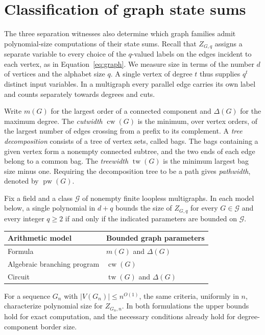\section{Classification of graph state sums}\label{sec:graph-classification}

The three separation witnesses also determine which graph families
admit polynomial-size computations of their state sums. Recall that
\(Z_{G,q}\) assigns a separate variable to every choice of the
\(q\)-valued labels on the
edges incident to each vertex, as in Equation~\eqref{eq:graph}.
We measure size in terms of the number \(d\) of vertices and the
alphabet size \(q\). A single vertex of degree \(t\) thus supplies
\(q^t\) distinct input variables. In a multigraph every parallel edge
carries its own label and counts separately towards degrees and cuts.

Write \(m(G)\) for the largest order of a connected component and
\(\Delta(G)\) for the maximum degree. The \emph{cutwidth}
\(\operatorname{cw}(G)\) is the minimum, over vertex orders, of the
largest number of edges crossing from a prefix to its complement.
A \emph{tree decomposition} consists of a tree of vertex sets, called
bags. The bags containing a given vertex form a nonempty connected
subtree, and the two ends of each edge belong to a common bag. The
\emph{treewidth} \(\operatorname{tw}(G)\) is the minimum largest bag
size minus one. Requiring the decomposition tree to be a path gives
\emph{pathwidth}, denoted by \(\operatorname{pw}(G)\).

\begin{theorem}\label{thm:graph-classification}
Fix a field and a class \(\mathcal G\) of nonempty finite loopless
multigraphs. In each model below, a single polynomial in \(d+q\)
bounds the size of \(Z_{G,q}\) for every \(G\in\mathcal G\) and
every integer \(q\ge2\) if and only if the indicated parameters
are bounded on \(\mathcal G\).
\begin{center}
\begin{tabular}{@{}ll@{}}
\toprule
\textup{Arithmetic model} & \textup{Bounded graph parameters}\\
\midrule
Formula & \(m(G)\) and \(\Delta(G)\)\\
Algebraic branching program & \(\operatorname{cw}(G)\)\\
Circuit & \(\operatorname{tw}(G)\) and \(\Delta(G)\)\\
\bottomrule
\end{tabular}
\end{center}
For a sequence \(G_n\) with \(|V(G_n)|\le n^{O(1)}\), the same criteria,
uniformly in \(n\), characterize polynomial size for \(Z_{G_n,n}\).
In both formulations the upper bounds hold for exact computation, and
the necessary conditions already hold for degree-component border size.
\end{theorem}

